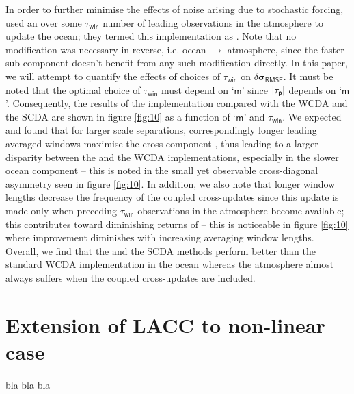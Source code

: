 \documentclass[a4paper,10pt]{article}
\begin{document}
\begin{multicols}{2}
{\noindent}In order to further minimise the effects of noise arising due to stochastic forcing, \citet{lu2015a} used an  over some $\tau_\mathsf{win}$ number of leading observations in the atmosphere to update the ocean; they termed this implementation as {\lacc} \citep{lu2015a, lu2015b}. Note that no modification was necessary in reverse, i.e. ocean $\rightarrow$ atmosphere, since the faster sub-component doesn't benefit from any such modification directly. In this paper, we will attempt to quantify the effects of choices of $\tau_\mathsf{win}$ on $\delta\boldsymbol{\sigma}_\mathsf{RMSE}$. It must be noted that the optimal choice of $\tau_\mathsf{win}$ must depend on `$\mathsf{m}$' since $|\tau_\mathsf{p}|$ depends on `$\mathsf{m}$'. Consequently, the results of the {\lacc} implementation compared with the \textsf{WCDA} and the \textsf{SCDA} are shown in figure \ref{fig:10} as a function of `$\mathsf{m}$' and $\tau_\mathsf{win}$. We expected and found that for larger scale separations, correspondingly longer leading averaged windows maximise the cross-component {\snr}, thus leading to a larger disparity between the {\lacc} and the \textsf{WCDA} implementations, especially in the slower ocean component -- this is noted in the small yet observable cross-diagonal asymmetry seen in figure \ref{fig:10}. In addition, we also note that longer window lengths decrease the frequency of the coupled cross-updates since this update is made only when preceding $\tau_\mathsf{win}$ observations in the atmosphere become available; this contributes toward diminishing returns of {\lacc} -- this is noticeable in figure \ref{fig:10} where improvement diminishes with increasing averaging window lengths. Overall, we find that the {\lacc} and the \textsf{SCDA} methods perform better than the standard \textsf{WCDA} implementation in the ocean whereas the atmosphere almost always suffers when the coupled cross-updates are included. 
\section{Extension of LACC to non-linear case}
\textsf{bla bla bla}
\label{sec:nonlinear}


\end{multicols}
\end{document}
